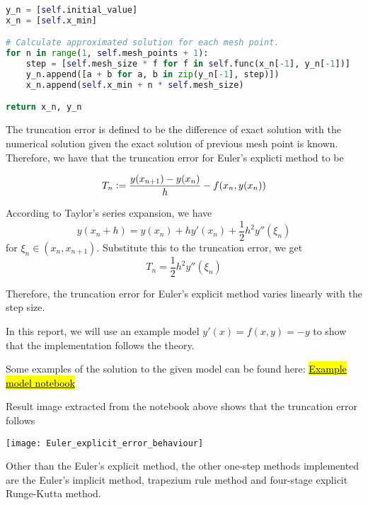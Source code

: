 \begin{lstlisting}[language=Python]
y_n = [self.initial_value]
x_n = [self.x_min]

# Calculate approximated solution for each mesh point.
for n in range(1, self.mesh_points + 1):
    step = [self.mesh_size * f for f in self.func(x_n[-1], y_n[-1])]
    y_n.append([a + b for a, b in zip(y_n[-1], step)])
    x_n.append(self.x_min + n * self.mesh_size)

return x_n, y_n
\end{lstlisting}

The truncation error is defined to be the difference of exact solution with the numerical solution given the exact solution of previous mesh point is known. Therefore, we have that the truncation error for Euler's explicti method to be

\begin{equation}
    T_n \vcentcolon= \frac{y(x_{n+1}) - y(x_{n})}{h} - f(x_n, y(x_n))
\end{equation}

According to Taylor's series expansion, we have 
\begin{equation}
    y(x_n + h) = y(x_n) + hy'(x_n) + \frac{1}{2}h^2y''(\xi_n)
\end{equation}
for $\xi_n \in (x_n, x_{n+1})$. Substitute this to the truncation error, we get
\begin{equation}
    T_n = \frac{1}{2}h^2y''(\xi_n)
\end{equation}

Therefore, the truncation error for Euler's explicit method varies linearly with the step size.

In this report, we will use an example model $y'(x) = f(x,y) = -y$ to show that the implementation follows the theory.

Some examples of the solution to the given model can be found here: \href{https://nbviewer.jupyter.org/github/FarmHJ/numerical-solver/blob/issue-11-fhn-notebook/examples/solver_convergence.ipynb}{\hl{Example model notebook}}

Result image extracted from the notebook above shows that the truncation error follows 

\texttt{[image: Euler\_explicit\_error\_behaviour]}

Other than the Euler's explicit method, the other one-step methods implemented are the Euler's implicit method, trapezium rule method and four-stage explicit Runge-Kutta method.

